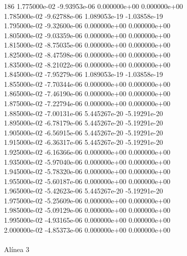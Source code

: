 186	1.775000e-02	-9.93953e-06	0.000000e+00	0.000000e+00	\\ 	1.785000e-02	-9.62788e-06	1.089053e-19	-1.03858e-19	\\ 	1.795000e-02	-9.32600e-06	0.000000e+00	0.000000e+00	\\ 	1.805000e-02	-9.03359e-06	0.000000e+00	0.000000e+00	\\ 	1.815000e-02	-8.75035e-06	0.000000e+00	0.000000e+00	\\ 	1.825000e-02	-8.47598e-06	0.000000e+00	0.000000e+00	\\ 	1.835000e-02	-8.21022e-06	0.000000e+00	0.000000e+00	\\ 	1.845000e-02	-7.95279e-06	1.089053e-19	-1.03858e-19	\\ 	1.855000e-02	-7.70344e-06	0.000000e+00	0.000000e+00	\\ 	1.865000e-02	-7.46190e-06	0.000000e+00	0.000000e+00	\\ 	1.875000e-02	-7.22794e-06	0.000000e+00	0.000000e+00	\\ 	1.885000e-02	-7.00131e-06	5.445267e-20	-5.19291e-20	\\ 	1.895000e-02	-6.78179e-06	5.445267e-20	-5.19291e-20	\\ 	1.905000e-02	-6.56915e-06	5.445267e-20	-5.19291e-20	\\ 	1.915000e-02	-6.36317e-06	5.445267e-20	-5.19291e-20	\\ 	1.925000e-02	-6.16366e-06	0.000000e+00	0.000000e+00	\\ 	1.935000e-02	-5.97040e-06	0.000000e+00	0.000000e+00	\\ 	1.945000e-02	-5.78320e-06	0.000000e+00	0.000000e+00	\\ 	1.955000e-02	-5.60187e-06	0.000000e+00	0.000000e+00	\\ 	1.965000e-02	-5.42623e-06	5.445267e-20	-5.19291e-20	\\ 	1.975000e-02	-5.25609e-06	0.000000e+00	0.000000e+00	\\ 	1.985000e-02	-5.09129e-06	0.000000e+00	0.000000e+00	\\ 	1.995000e-02	-4.93165e-06	0.000000e+00	0.000000e+00	\\ 	2.000000e-02	-4.85373e-06	0.000000e+00	0.000000e+00	\\ \hline
\\ \hline
                                   Alínea 3 \\ \hline
